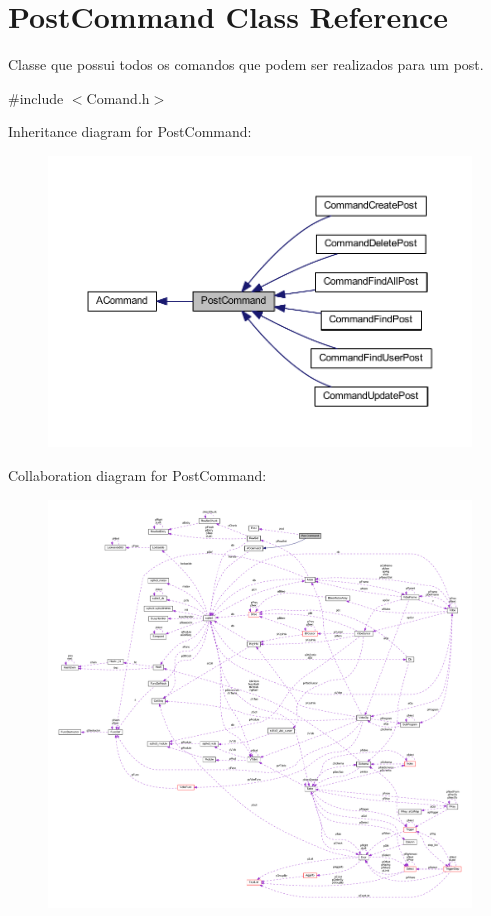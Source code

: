 \hypertarget{class_post_command}{\section{Post\-Command Class Reference}
\label{class_post_command}
}


Classe que possui todos os comandos que podem ser realizados para um post.  




{\ttfamily \#include $<$Comand.\-h$>$}



Inheritance diagram for Post\-Command\-:\nopagebreak
\begin{figure}[H]
\begin{center}
\leavevmode
\includegraphics[width=350pt]{class_post_command__inherit__graph}
\end{center}
\end{figure}


Collaboration diagram for Post\-Command\-:\nopagebreak
\begin{figure}[H]
\begin{center}
\leavevmode
\includegraphics[width=350pt]{class_post_command__coll__graph}
\end{center}
\end{figure}
